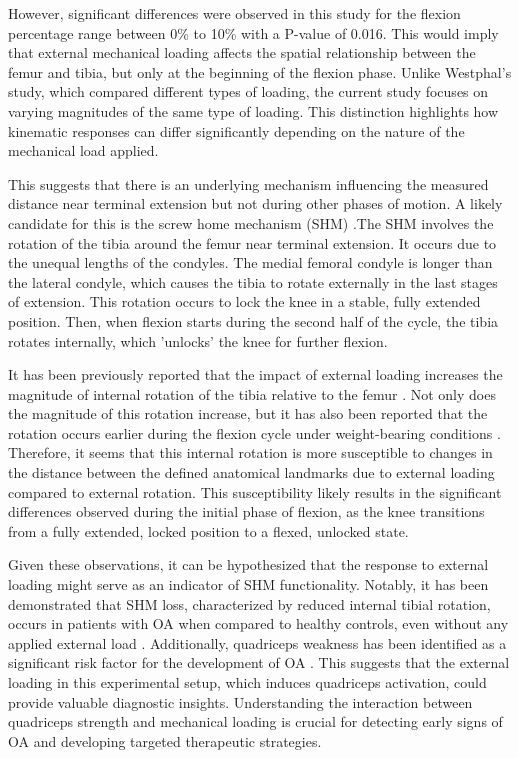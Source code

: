 \documentclass{micro-econ-thesis}
\begin{document}
However, significant differences were observed in this study for the flexion percentage range between 0\% to 10\% with a P-value of 0.016. This would imply that external mechanical loading affects the spatial relationship between the femur and tibia, but only at the beginning of the flexion phase.  Unlike Westphal's study, which compared different types of loading, the current study focuses on varying magnitudes of the same type of loading. This distinction highlights how kinematic responses can differ significantly depending on the nature of the mechanical load applied.

This suggests that there is an underlying mechanism influencing the measured distance near terminal extension but not during other phases of motion. A likely candidate for this is the screw home mechanism (SHM) \parencite{kim_screw-home_2015}.The SHM involves the rotation of the tibia around the femur near terminal extension. It occurs due to the unequal lengths of the condyles. The medial femoral condyle is longer than the lateral condyle, which causes the tibia to rotate externally in the last stages of extension.   This rotation occurs to lock the knee in a stable, fully extended position. Then, when flexion starts during the second half of the cycle, the tibia rotates internally, which 'unlocks' the knee for further flexion.

It has been previously reported that the impact of external loading increases the magnitude of internal rotation of the tibia relative to the femur \parencite{myers_vivo_2012}. Not only does the magnitude of this rotation increase, but it has also been reported that the rotation occurs earlier during the flexion cycle under weight-bearing conditions \parencite{johal_tibio-femoral_2005}. Therefore, it seems that this internal rotation is more susceptible to changes in the distance between the defined anatomical landmarks due to external loading compared to external rotation. This susceptibility likely results in the significant differences observed during the initial phase of flexion, as the knee transitions from a fully extended, locked position to a flexed, unlocked state.  

Given these observations, it can be hypothesized that the response to external loading might serve as an indicator of SHM functionality. Notably, it has been demonstrated that SHM loss, characterized by reduced internal tibial rotation, occurs in patients with OA when compared to healthy controls, even without any applied external load \parencite{jeon_alteration_2020}. Additionally, quadriceps weakness has been identified as a significant risk factor for the development of OA \parencite{segal_is_2011}. This suggests that the external loading in this experimental setup, which induces quadriceps activation, could provide valuable diagnostic insights. Understanding the interaction between quadriceps strength and mechanical loading is crucial for detecting early signs of OA and developing targeted therapeutic strategies.
\end{document}
